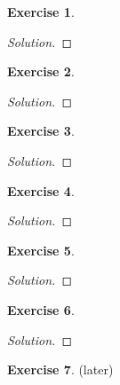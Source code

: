 \documentclass[12pt,a4]{article}
\theoremstyle{definition}
\newtheorem{exercise}{Exercise}
\begin{document}
\begin{exercise}
	
\end{exercise}
\begin{proof}[Solution]
	
\end{proof}

\begin{exercise}
	
\end{exercise}
\begin{proof}[Solution]
	
\end{proof}

\begin{exercise}
	
\end{exercise}
\begin{proof}[Solution]
	
\end{proof}

\begin{exercise}
	
\end{exercise}
\begin{proof}[Solution]
	
\end{proof}

\begin{exercise}
	
\end{exercise}
\begin{proof}[Solution]
	
\end{proof}

\begin{exercise}
	
\end{exercise}
\begin{proof}[Solution]
	
\end{proof}

\begin{exercise}
	(later)
\end{exercise}
\end{document}
